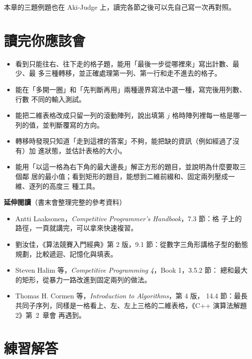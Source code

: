 本章的三題例題也在 Aki-Judge 上，讀完各節之後可以先自己寫一次再對照。

\section{讀完你應該會}
\label{sec:dp2-checklist}

\begin{itemize}
\item 看到只能往右、往下走的格子題，能用「最後一步從哪裡來」寫出計數、最少、最
多三種轉移，並正確處理第一列、第一行和走不進去的格子。
\item 能在「多開一圈」和「先判斷再用」兩種邊界寫法中選一種，寫完後用列數、行數
不同的輸入測試。
\item 能把二維表格改成只留一列的滾動陣列，說出填第 $j$ 格時陣列裡每一格是哪一
列的值，並判斷覆寫的方向。
\item 轉移時發現只知道「走到這裡的答案」不夠，能把缺的資訊（例如經過了沒有）加
進狀態，並估計表格的大小。
\item 能用「以這一格為右下角的最大邊長」解正方形的題目，並說明為什麼要取三個鄰
居的最小值；看到矩形的題目，能想到二維前綴和、固定兩列壓成一維、逐列的高度三
種工具。
\end{itemize}

\textbf{延伸閱讀}（書末會整理完整的參考資料）

\begin{itemize}
\item Antti Laaksonen，\textit{Competitive Programmer's Handbook}，7.3 節：格
子上的路徑，一頁就講完，可以拿來快速複習。
\item 劉汝佳，《算法競賽入門經典》第 2 版，9.1 節：從數字三角形講格子型的動態
規劃，比較遞迴、記憶化與填表。
\item Steven Halim 等，\textit{Competitive Programming 4}，Book 1，3.5.2 節：
總和最大的矩形，從暴力一路改進到固定兩列的做法。
\item Thomas H. Cormen 等，\textit{Introduction to Algorithms}，第 4 版，
14.4 節：最長共同子序列，同樣是一格看上、左、左上三格的二維表格，《C++ 演算法解題 2》第~2~章會
再遇到。
\end{itemize}

\section*{練習解答}

